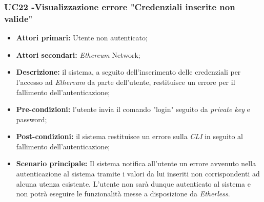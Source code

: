 \subsubsection{UC22 -Visualizzazione errore "Credenziali inserite non valide"}
\begin{itemize}
	\item \textbf{Attori primari:} Utente non autenticato;
    \item \textbf{Attori secondari:} \textit{Ethereum\glo} Network;
	\item \textbf{Descrizione:} il sistema, a seguito dell'inserimento delle credenziali per l'accesso ad \textit{Ethereum\glo} da parte dell'utente, restituisce un errore per il fallimento dell'autenticazione;
	\item \textbf{Pre-condizioni:} l'utente invia il comando "login" seguito da \textit{private key\glos} e password;
	\item \textbf{Post-condizioni:} il sistema restituisce un errore sulla \textit{CLI\glo} in seguito al fallimento dell'autenticazione;
	\item \textbf{Scenario principale:} Il sistema notifica all'utente un errore avvenuto nella autenticazione al sistema tramite i valori da lui inseriti non corrispondenti ad alcuna utenza esistente. L'utente non sarà dunque autenticato al sistema e non potrà eseguire le funzionalità messe a disposizione da \textit{Etherless}.
\end{itemize}